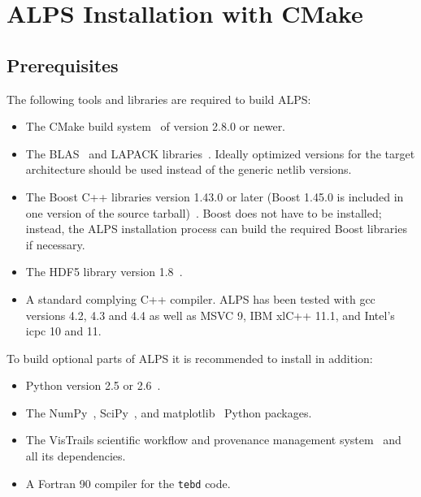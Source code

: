 \documentclass[12pt]{iopart}
\begin{document}

\section{ALPS Installation with CMake}
\label{sec:cmake}

\subsection{Prerequisites}

The following tools and libraries are required to build ALPS:

\begin{itemize}
\item The CMake build system~\cite{cmake} of version 2.8.0 or newer.
\item The BLAS~\cite{blasnetlib} and LAPACK libraries~\cite{lapack}. Ideally optimized versions for the target architecture should be used instead of the generic netlib versions.
\item The Boost C++ libraries version 1.43.0 or later (Boost 1.45.0 is included in one version of the source tarball)~\cite{boost}. Boost does not have to be installed; instead, the ALPS installation process can build the required Boost libraries if necessary.
\item The HDF5 library version 1.8~\cite{hdf5}.
\item A standard complying C++ compiler. ALPS has been tested with gcc versions 4.2, 4.3 and 4.4 as well as MSVC 9, IBM xlC++ 11.1, and Intel's icpc 10 and 11.
\end{itemize}
To build optional parts of ALPS it is recommended to install in addition:
\begin{itemize}
\item Python version 2.5 or 2.6~\cite{python}.
\item The  NumPy~\cite{numpy}, SciPy~\cite{scipy}, and matplotlib~\cite{matplotlib} Python packages.
\item The VisTrails scientific workflow and provenance management system~\cite{vistrails} and all its dependencies.
\item A Fortran 90 compiler for the {\tt tebd} code.
\end{itemize}
\end{document}
